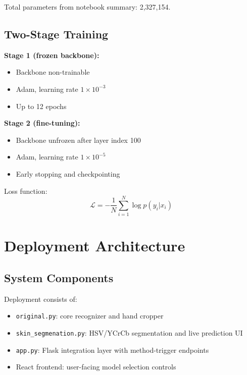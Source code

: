 \documentclass[conference]{IEEEtran}
\begin{document}
Total parameters from notebook summary: 2,327,154.

\subsection{Two-Stage Training}
\textbf{Stage 1 (frozen backbone):}
\begin{itemize}
\item Backbone non-trainable
\item Adam, learning rate \(1\times10^{-3}\)
\item Up to 12 epochs
\end{itemize}

\textbf{Stage 2 (fine-tuning):}
\begin{itemize}
\item Backbone unfrozen after layer index 100
\item Adam, learning rate \(1\times10^{-5}\)
\item Early stopping and checkpointing
\end{itemize}

Loss function:
\begin{equation}
\mathcal{L} = -\frac{1}{N}\sum_{i=1}^{N}\log p(y_i|x_i)
\end{equation}

\section{Deployment Architecture}
\subsection{System Components}
Deployment consists of:
\begin{itemize}
\item \texttt{original.py}: core recognizer and hand cropper
\item \texttt{skin\_segmenation.py}: HSV/YCrCb segmentation and live prediction UI
\item \texttt{app.py}: Flask integration layer with method-trigger endpoints
\item React frontend: user-facing model selection controls
\end{itemize}
\end{document}
